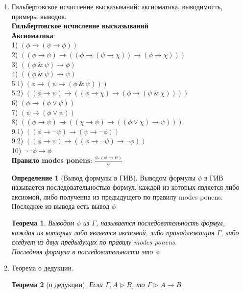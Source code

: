\documentclass[a4paper]{article}
\newtheorem*{theorem*}{Теорема}
\theoremstyle{definition}
\newtheorem*{definition*}{Определение}
\begin{document}
\begin{enumerate}
 \item Гильбертовское исчисление высказываний: аксиоматика, выводимость, примеры выводов.\\
       \textbf{Гильбертовское исчисление высказываний}\\
       \textbf{Аксиоматика}:\\
       1) $(\phi \to (\psi \to \phi))$\\
       2) $((\phi \to \psi)\to((\phi \to (\psi \to \chi))\to (\phi\to\chi) ))$\\
       3) $((\phi\ \&\ \psi)\to\phi)$\\
       4) $((\phi\ \&\ \psi)\to\psi)$\\
       5.1) $(\phi \to (\psi \to (\phi\ \&\ \psi)))$\\
       5.2) $((\phi \to \psi)\to((\phi \to \chi)\to(\phi\to(\psi\ \&\ \chi))))$\\
       6) $(\phi \to (\phi \lor \psi))$\\
       7) $(\psi \to (\phi \lor \psi))$\\
       8) $((\phi \to \psi)\to((\chi \to \psi)\to((\phi \lor \chi)\to\psi)))$\\
       9.1) $((\phi \to \lnot \psi)\to(\psi \to \lnot \phi))$\\
       9.2) $((\phi \to \psi)\to((\phi\to\lnot\psi)\to\lnot\phi))$\\
       10)  $\lnot\lnot\phi\to\phi$\\
       \textbf{Правило modes ponens}:
       $\frac{\phi, (\phi \to \psi)}{\psi}$
       \begin{definition*}[Вывод формулы в ГИВ]
        Выводом формулы $\phi$ в ГИВ называется последовательностью формул, каждой из которых является либо аксиомой, либо полученна из предыдущего по правилу modes ponens. \\
        Последнее из вывода есть вывод $\phi$
       \end{definition*}
       \begin{theorem*}
        Выводом $\phi$ из $\Gamma$, называется последовательность формул, каждая из которых либо является аксиомой, либо принадлежащая $\Gamma$, либо следует из двух предыдущих по правилу modes ponens.\\
        Последняя формула в последовательности это $\phi$
       \end{theorem*}
 \item Теорема о дедукции.
       \begin{theorem*}[о дедукции]
        Если $\Gamma, A \triangleright B$, то $\Gamma \triangleright A\to{B}$

\end{theorem*}
\end{enumerate}
\end{document}
